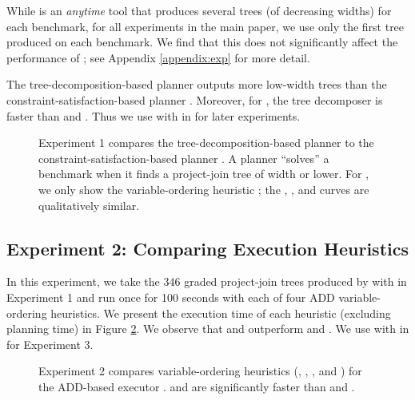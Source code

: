 While \Lg{} is an \emph{anytime} tool that produces several trees (of decreasing widths) for each benchmark, for all experiments in the main paper, we use only the first tree produced on each benchmark.
We find that this does not significantly affect the performance of \procount{}; see Appendix \ref{appendix:exp} for more detail.

The tree-decomposition-based planner \Lg{} outputs more low-width trees than the constraint-satisfaction-based planner \htb{}.
Moreover, for \Lg{}, the tree decomposer \flowcutter{} is faster than \htd{} and \tamaki{}.
Thus we use \Lg{} with \flowcutter{} in \procount{} for later experiments.
\begin{figure}[t]
    \centering
    
    \caption{
        Experiment 1 compares the tree-decomposition-based planner \Lg{} to the constraint-satisfaction-based planner \htb{}.
	    A planner ``solves'' a benchmark when it finds a project-join tree of width \maxWidth{} or lower.
        For \htb, we only show the variable-ordering heuristic \mcs{}; the \lexp{}, \lexm{}, and \minfill{} curves are qualitatively similar.
    }
    \label{figPlanning}
\end{figure}


\subsection{Experiment 2: Comparing Execution Heuristics}

In this experiment, we take the 346 graded project-join trees produced by \Lg{} with \flowcutter{} in Experiment 1 %
and run \dmc{} once for 100 seconds with each of four ADD variable-ordering heuristics. 
We present the execution time of each heuristic (excluding planning time) in Figure \ref{figExecution}. 
We observe that \mcs{} and \lexp{} outperform \lexm{} and \minfill{}.
We use \dmc{} with \mcs{} in \procount{} for Experiment 3.
\begin{figure}[t]
    \centering
    
    \caption{
        Experiment 2 compares variable-ordering heuristics (\mcs{}, \lexp, \lexm, and \minfill{}) for the ADD-based executor \dmc.
        \mcs{} and \lexp{} are significantly faster than \lexm{} and \minfill{}.
    }
    \label{figExecution}
\end{figure}

